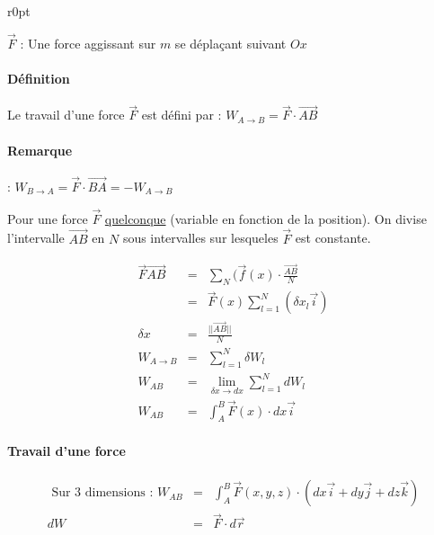 \begin{wrapfigure}[6]{r}{0pt}
\end{wrapfigure}

$\vec{F}$ : Une force aggissant sur $m$ se déplaçant suivant $Ox$

\paragraph{Définition} Le travail d'une force $\vec{F}$ est défini par : $W_{A \rightarrow B} = \vec{F}\cdot\overrightarrow{AB}$
\paragraph{Remarque} : $W_{B \rightarrow A} = \vec{F}\cdot\overrightarrow{BA} = -W_{A \rightarrow B} $

Pour une force $\vec{F}$ \ul{quelconque} (variable en fonction de la position). On divise l'intervalle $\vec{AB}$ en $N$ sous intervalles sur lesqueles $\vec{F}$ est constante.

\[
	\begin{array}{rcl}
		\vec{F}\overrightarrow{AB} &=& \sum_N(\vec{f}(x) \cdot \frac{\overrightarrow{AB}}{N} \\
								   &=& \vec{F}(x) \sum_{l=1}^{N}(\delta x_l \vec{i}) \\
		\delta x &=& \frac{||\overrightarrow{AB}||}{N} \\
		W_{A \rightarrow B} &=& \sum_{l=1}^N \delta W_l \\
		W_{AB} &=& \lim_{\delta x \to dx} \sum_{l=1}^N dW_l \\
		W_{AB} &=& \int_A^B \vec{F}(x)\cdot dx\vec{i}
\end{array}\]

\paragraph{Travail d'une force}

\[\begin{array}{rcl}
		\text{ Sur 3 dimensions : }	W_{AB} &=& \int_A^B\vec{F}(x, y, z) \cdot (dx\vec{i}+dy\vec{j}+dz\vec{k}) \\
		dW &=& \vec{F}\cdot d\vec{r}
\end{array}\]


